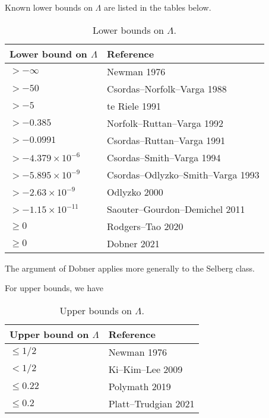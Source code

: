 Known lower bounds on $\Lambda$ are listed in the tables below.

\begin{table}[ht]
  \caption{Lower bounds on $\Lambda$.}
  \begin{tabular}{|l|l|}
  \hline
  Lower bound on $\Lambda$ & Reference \\
  \hline
  $>-\infty$ & Newman 1976 \cite{newman} \\
  $>-50$ & Csordas--Norfolk--Varga 1988 \cite{cnv} \\
  $>-5$ & te Riele 1991 \cite{tr} \\
  $>-0.385$ & Norfolk--Ruttan--Varga 1992 \cite{nrv} \\
  $>-0.0991$ & Csordas--Ruttan--Varga 1991 \cite{csordas_laguerre_1991} \\
  \hline
  $>-4.379 \times 10^{-6}$ & Csordas--Smith--Varga 1994 \cite{csv} \\
  $>-5.895 \times 10^{-9}$ & Csordas--Odlyzko--Smith--Varga 1993 \cite{cosv} \\
  $>-2.63 \times 10^{-9}$ & Odlyzko 2000 \cite{odlyzko} \\
  $>-1.15 \times 10^{-11}$ & Saouter--Gourdon--Demichel 2011 \cite{saouter} \\
  \hline
  $\geq 0$ & Rodgers--Tao 2020 \cite{rodgers-tao} \\
  $\geq 0$ & Dobner 2021 \cite{dobner} \\
  \hline
  \end{tabular}
  \end{table}

  The argument of Dobner applies more generally to the Selberg class.

  For upper bounds, we have
  \begin{table}[ht]
    \caption{Upper bounds on $\Lambda$.}
    \begin{tabular}{|l|l|}
    \hline
    Upper bound on $\Lambda$ & Reference \\
    \hline
    $\leq 1/2$ & Newman 1976 \cite{newman} \\
    $< 1/2$ & Ki--Kim--Lee 2009 \cite{kkl} \\
    $\leq 0.22$ & Polymath 2019 \cite{polymath15} \\
    $\leq 0.2$ & Platt--Trudgian 2021 \cite{platt-trudgian} \\
    \hline
  \end{tabular}
\end{table}
